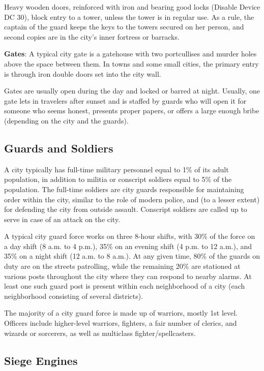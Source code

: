 Heavy wooden doors, reinforced with iron and bearing good locks (Disable Device DC 30), block entry to a tower, unless the tower is in regular use. As a rule, the captain of the guard keeps the keys to the towers secured on her person, and second copies are in the city's inner fortress or barracks.
				
\textbf{Gates}: A typical city gate is a gatehouse with two portcullises and murder holes above the space between them. In towns and some small cities, the primary entry is through iron double doors set into the city wall.
				
Gates are usually open during the day and locked or barred at night. Usually, one gate lets in travelers after sunset and is staffed by guards who will open it for someone who seems honest, presents proper papers, or offers a large enough bribe (depending on the city and the guards).
				
\subsection{Guards and Soldiers}

				
A city typically has full-time military personnel equal to 1\% of its adult population, in addition to militia or conscript soldiers equal to 5\% of the population. The full-time soldiers are city guards responsible for maintaining order within the city, similar to the role of modern police, and (to a lesser extent) for defending the city from outside assault. Conscript soldiers are called up to serve in case of an attack on the city.
				
A typical city guard force works on three 8-hour shifts, with 30\% of the force on a day shift (8 a.m. to 4 p.m.), 35\% on an evening shift (4 p.m. to 12 a.m.), and 35\% on a night shift (12 a.m. to 8 a.m.). At any given time, 80\% of the guards on duty are on the streets patrolling, while the remaining 20\% are stationed at various posts throughout the city where they can respond to nearby alarms. At least one such guard post is present within each neighborhood of a city (each neighborhood consisting of several districts).
				
The majority of a city guard force is made up of warriors, mostly 1st level. Officers include higher-level warriors, fighters, a fair number of clerics, and wizards or sorcerers, as well as multiclass fighter/spellcasters.
				
\subsection{Siege Engines}

